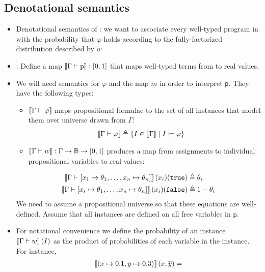 \documentclass{tufte-handout}
\begin{document}
\subsection{Denotational semantics}
\begin{itemize}
  \item Denotational semantics of \prop{}: we want to associate every well-typed
  program in \prop{} with the probability that $\varphi$ holds according to the
  fully-factorized distribution described by $w$


  \item {}: Define a map $\left \llbracket {\Gamma \vdash \texttt{p}} \right \rrbracket : [0,1]$ that maps well-typed terms from 
  \prop{} to real values. 
  \item We will need semantics for $\varphi$ and the map $m$ in order to
  interpret \texttt{p}. 
  They have the following types:
  \begin{itemize}
    \item $\left \llbracket {\Gamma \vdash \varphi} \right \rrbracket$ maps propositional formulae to the
    set of all instances that model them over universe drawn from $\Gamma$:
    \begin{align}
     \left \llbracket {\Gamma \vdash \varphi} \right \rrbracket &\triangleq \{I \in \left \llbracket {\Gamma} \right \rrbracket \mid I \models \varphi \}
    \end{align}
    \item $\left \llbracket {\Gamma \vdash w} \right \rrbracket : \Gamma \rightarrow \mathbb{B} \rightarrow [0, 1]$ produces a
    map from assignments to individual propositional variables to real values:
  \end{itemize}
  \begin{align}
    \left \llbracket {\Gamma \vdash [x_1 \mapsto \theta_1, \dots, x_n \mapsto \theta_n]} \right \rrbracket(x_i)(\texttt{true}) &\triangleq \theta_i\\
    \left \llbracket {\Gamma \vdash [x_i \mapsto \theta_1, \dots, x_n \mapsto \theta_n]} \right \rrbracket(x_i)(\texttt{false}) &\triangleq 1-\theta_i
  \end{align}
  We need to assume a propositional universe so that these equations are well-defined.
  Assume that all instances are defined on all free variables in $\texttt{p}$.
  \item For notational convenience we define the probability of an instance $\left \llbracket {\Gamma \vdash w} \right \rrbracket(I)$
  as the product of probabilities of each variable in the instance. For
  instance,
  \begin{align*}
    \dbracket{(x \mapsto 0.1, y \mapsto 0.3)}(x, \overline{y}) = 

\end{align*}
\end{itemize}
\end{document}
